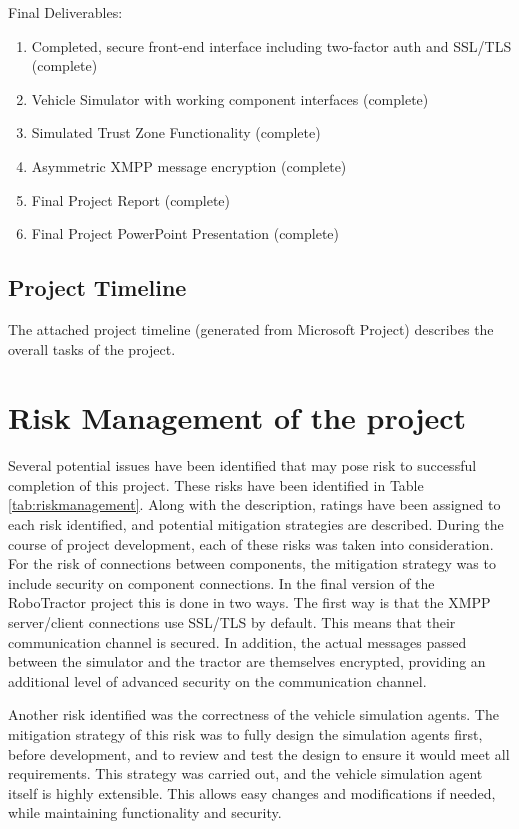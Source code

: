 \documentclass[conference,12pt]{IEEEtran}
\begin{document}
Final Deliverables:
\begin{enumerate}
\item Completed, secure front-end interface including two-factor auth and
    SSL/TLS (complete)
\item Vehicle Simulator with working component interfaces (complete)
\item Simulated Trust Zone Functionality (complete)
\item Asymmetric XMPP message encryption (complete)
\item Final Project Report (complete)
\item Final Project PowerPoint Presentation (complete)
\end{enumerate}

\subsection{Project Timeline}
The attached project timeline (generated from Microsoft Project) describes the
overall tasks of the project.

\section{Risk Management of the project}
Several potential issues have been identified that may pose risk to successful
completion of this project. These risks have been identified in Table
\ref{tab:riskmanagement}. Along with the description, ratings have been assigned
to each risk identified, and potential mitigation strategies are described. During the course of project development, each of these risks was taken into consideration. For the risk of connections between components, the mitigation strategy was to include security on component connections. In the final version of the RoboTractor project this is done in two ways. The first way is that the XMPP server/client connections use SSL/TLS by default. This means that their communication channel is secured. In addition, the actual messages passed between the simulator and the tractor are themselves encrypted, providing an additional level of advanced security on the communication channel. 

Another risk identified was the correctness of the vehicle simulation agents. The mitigation strategy of this risk was to fully design the simulation agents first, before development, and to review and test the design to ensure it would meet all requirements. This strategy was carried out, and the vehicle simulation agent itself is highly extensible. This allows easy changes and modifications if needed, while maintaining functionality and security. 
\end{document}
